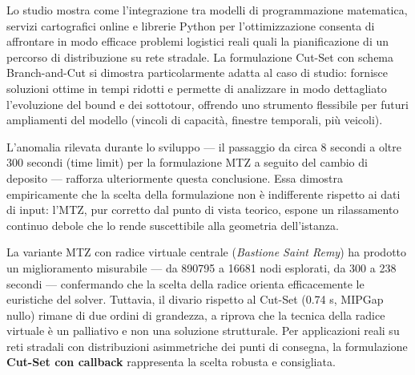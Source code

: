 \documentclass[a4paper,12pt]{article}
\begin{document}
Lo studio mostra come l’integrazione tra modelli di programmazione matematica, servizi cartografici online e librerie Python per l’ottimizzazione consenta di affrontare in modo efficace problemi logistici reali quali la pianificazione di un percorso di distribuzione su rete stradale.
La formulazione Cut-Set con schema Branch-and-Cut si dimostra particolarmente adatta al caso di studio: fornisce soluzioni ottime in tempi ridotti e permette di analizzare in modo dettagliato l’evoluzione del bound e dei sottotour, offrendo uno strumento flessibile per futuri ampliamenti del modello (vincoli di capacità, finestre temporali, più veicoli).

L’anomalia rilevata durante lo sviluppo — il passaggio da circa 8 secondi a oltre 300 secondi (time limit) per la formulazione MTZ a seguito del cambio di deposito — rafforza ulteriormente questa conclusione. Essa dimostra empiricamente che la scelta della formulazione non è indifferente rispetto ai dati di input: l’MTZ, pur corretto dal punto di vista teorico, espone un rilassamento continuo debole che lo rende suscettibile alla geometria dell’istanza.

La variante MTZ con radice virtuale centrale (\textit{Bastione Saint Remy}) ha prodotto un miglioramento misurabile — da 890795 a 16681 nodi esplorati, da 300 a 238 secondi — confermando che la scelta della radice orienta efficacemente le euristiche del solver. Tuttavia, il divario rispetto al Cut-Set (0.74 s, MIPGap nullo) rimane di due ordini di grandezza, a riprova che la tecnica della radice virtuale è un palliativo e non una soluzione strutturale. Per applicazioni reali su reti stradali con distribuzioni asimmetriche dei punti di consegna, la formulazione \textbf{Cut-Set con callback} rappresenta la scelta robusta e consigliata.
\end{document}
